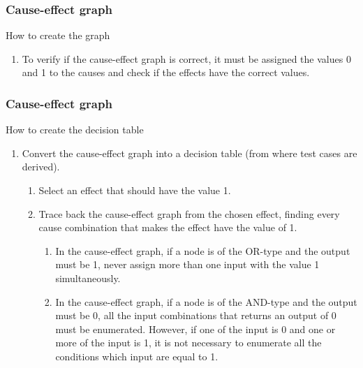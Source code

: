 \begin{frame}
\frametitle{Cause-effect graph}
\label{procedure:cause-effect-graph}

\begin{block:procedure}{How to create the graph}
\begin{enumerate}
	\item To verify if the cause-effect graph is correct, it must be assigned
	the values 0 and 1 to the causes and check if the effects have the
	correct values.
\end{enumerate}
\end{block:procedure}


\hfill
{}
\end{frame}



\begin{frame}
\frametitle{Cause-effect graph}

\begin{block:procedure}{How to create the decision table}
\begin{enumerate}
	\item Convert the cause-effect graph into a decision table (from where test
	cases are derived).
	\begin{enumerate}
		\item Select an effect that should have the value 1.

		\item Trace back the cause-effect graph from the chosen effect, finding
		every cause combination that makes the effect have the value of 1.
		\begin{enumerate}
				\item In the cause-effect graph, if a node is of the OR-type
				and the output must be 1, never assign more than one input with
				the value 1 simultaneously.

				\item In the cause-effect graph, if a node is of the AND-type
				and the output must be 0, all the input combinations that
				returns an output of 0 must be enumerated. However, if one of
				the input is 0 and one or more of the input is 1, it is not
				necessary to enumerate all the conditions which input are
				equal to 1.
		\end{enumerate}
	\end{enumerate}
\end{enumerate}
\end{block:procedure}
\end{frame}


